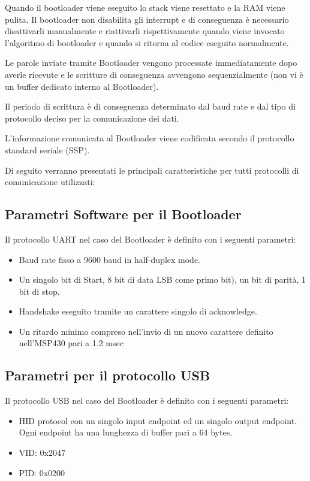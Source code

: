 \documentclass[LaM,binding=0.6cm]{../sapthesis}
\begin{document}
\newline

Quando il bootloader viene eseguito lo stack viene resettato e la RAM viene pulita. 
Il bootloader non disabilita gli interrupt e di conseguenza è necessario disattivarli manualmente e riattivarli rispettivamente quando viene invocato l’algoritmo di bootloader e quando si ritorna al codice eseguito normalmente.

Le parole inviate tramite Bootloader vengono processate immediatamente dopo averle ricevute e le scritture di conseguenza avvengono sequenzialmente (non vi è un buffer dedicato interno al Bootloader).

Il periodo di scrittura è di conseguenza determinato dal baud rate e dal tipo di protocollo deciso per la comunicazione dei dati.

L’informazione comunicata al Bootloader viene codificata secondo il protocollo standard seriale (SSP).

Di seguito verranno presentati le principali caratteristiche per tutti protocolli di comunicazione utilizzati:

\subsection{Parametri Software per il Bootloader}

Il protocollo UART nel caso del Bootloader è definito con i seguenti parametri:

\begin{itemize}
\item Baud rate fisso a 9600 baud in half-duplex mode.
\item  Un singolo bit di Start, 8 bit di data LSB come primo bit), un bit di parità, 1 bit di stop.
\item Handshake eseguito tramite un carattere singolo di acknowledge.
\item Un ritardo minimo compreso nell’invio di un nuovo carattere definito nell’MSP430 pari a 1.2 msec
\end{itemize}

\subsection{Parametri per il protocollo USB}
Il protocollo USB nel caso del Bootloader è definito con i seguenti parametri:

\begin{itemize}
\item HID protocol con un singolo input endpoint ed un singolo output endpoint. Ogni endpoint ha una lunghezza di buffer pari a 64 bytes.
\item  VID: 0x2047
\item  PID: 0x0200
\end{itemize}
\end{document}
